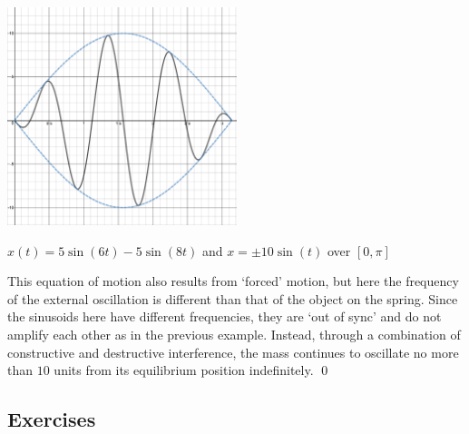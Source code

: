 \begin{ex}
\begin{enumerate}
\begin{center}
\includegraphics[height=2.5in]{./TrigonometricEquationsandInequalitiesGraphics/Sinusoid10.jpg} 


{\boldmath $x(t) = 5\sin(6t) - 5\sin(8t)$} and  $x = \pm 10 \sin(t)$ over $[0,\pi]$



\end{center}

 This equation of motion also results from `forced' motion, but here the frequency of the external oscillation is different than that of the object on the spring.  Since the sinusoids here have different frequencies, they are `out of sync' and  do not amplify each other as in the previous example.  Instead, through a combination of constructive and destructive interference, the mass continues to oscillate no more than $10$ units from its equilibrium position indefinitely.  \qed


\end{enumerate}

\end{ex}

\newpage

\subsection{Exercises}

\closegraphsfile